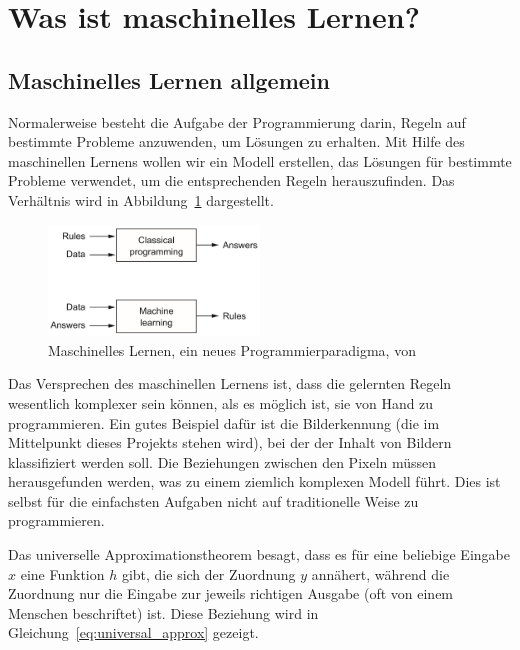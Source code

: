 \section{Was ist maschinelles Lernen?} \label{ch:what_is_ml}

\subsection{Maschinelles Lernen allgemein}

Normalerweise besteht die Aufgabe der Programmierung darin, Regeln auf bestimmte Probleme anzuwenden, um Lösungen zu erhalten.
Mit Hilfe des maschinellen Lernens wollen wir ein Modell erstellen, das Lösungen für bestimmte Probleme verwendet, um die entsprechenden Regeln herauszufinden.
Das Verhältnis wird in Abbildung~\ref{fig:cp_vs_ml} dargestellt.

\begin{figure}
    \centering
    \includegraphics[width=0.5\textwidth]{images/classical_prog_vs_ml.png}
    \caption[ML, ein neues Programmierparadigma]{Maschinelles Lernen, ein neues Programmierparadigma, von \cite[S.5]{Chollet2017}}
    \label{fig:cp_vs_ml}
\end{figure}

Das Versprechen des maschinellen Lernens ist, dass die gelernten Regeln wesentlich komplexer sein können, als es möglich ist, sie von Hand zu programmieren.
Ein gutes Beispiel dafür ist die Bilderkennung (die im Mittelpunkt dieses Projekts stehen wird), bei der der Inhalt von Bildern klassifiziert werden soll.
Die Beziehungen zwischen den Pixeln müssen herausgefunden werden, was zu einem ziemlich komplexen Modell führt.
Dies ist selbst für die einfachsten Aufgaben nicht auf traditionelle Weise zu programmieren.

Das universelle Approximationstheorem \cite{Cybenko1989} \cite{Hornik1989} besagt, dass es für eine beliebige Eingabe $x$ eine Funktion $h$ gibt, die sich der Zuordnung $y$ annähert, während die Zuordnung nur die Eingabe zur jeweils richtigen Ausgabe (oft von einem Menschen beschriftet) ist.
Diese Beziehung wird in Gleichung~\eqref{eq:universal_approx} gezeigt.

